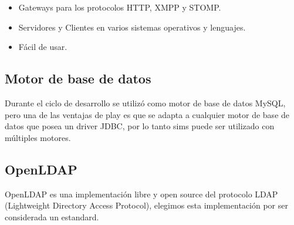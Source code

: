 \begin{itemize}
\item Gateways para los protocolos HTTP, XMPP y STOMP.
\item Servidores y Clientes en varios sistemas operativos y lenguajes.
\item Fácil de usar.
\end{itemize}
 
\subsection{Motor de base de datos}

Durante el ciclo de desarrollo se utilizó como motor de base de datos MySQL, pero una de las ventajas de play es que se adapta a cualquier motor de
base de datos que posea un driver JDBC, por lo tanto sims puede ser utilizado con múltiples motores.

\subsection{OpenLDAP}

OpenLDAP es una implementación libre y open source del protocolo LDAP (Lightweight Directory Access Protocol), elegimos esta implementación por ser considerada un estandard.





